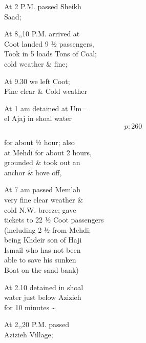 \documentclass{report}
\begin{document}
	\par{
 	At 2 P.M. passed Sheikh\ \\Saad;\ \\
	}

	\par{
 	At 8,,10 P.M. arrived at\ \\Coot landed 9 ½ passengers,\ \\Took in 5 loads Tons of Coal;\ \\cold weather \& fine;\ \\
	}

	\par{
 	At 9.30 we left Coot;\ \\Fine clear \& Cold weather\ \\
	}

	\par{
 	At 1 am detained at Um=\ \\el Ajaj in shoal water\ \\
  \[p: 260 \]

	}

	\par{
 	for about ½ hour; also\ \\at Mehdi for about 2 hours,\ \\grounded \& took out an\ \\anchor \& hove off,\ \\
	}

	\par{
 	At 7 am passed Memlah\ \\very fine clear weather \&\ \\cold N.W. breeze; gave\ \\tickets to 22 ½ Coot passengers\ \\(including 2 ½ from Mehdi;\ \\being Khdeir son of Haji\ \\Ismail who has not been\ \\able to save his sunken\ \\Boat on the sand bank)\ \\
	}

	\par{
 	At 2.10 detained in shoal\ \\water just below Azizieh\ \\for 10 minutes \~{}\ \\
	}

	\par{
 	At 2,,20 P.M. passed\ \\Azizieh Village;\ \\
	}
\end{document}
